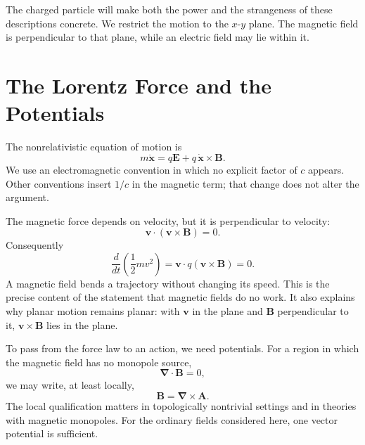 The charged particle will make both the power and the strangeness of these
descriptions concrete. We restrict the motion to the \(x\)-\(y\) plane. The
magnetic field is perpendicular to that plane, while an electric field may
lie within it.

\section{The Lorentz Force and the Potentials}

The nonrelativistic equation of motion is
\begin{equation}
 m\ddot{\bm x}=q\bm E+q\,\dot{\bm x}\times\bm B.
 \label{eq:l08-lorentz-force}
\end{equation}
We use an electromagnetic convention in which no explicit factor of \(c\)
appears. Other conventions insert \(1/c\) in the magnetic term; that change
does not alter the argument.

The magnetic force depends on velocity, but it is perpendicular to velocity:
\begin{equation}
 \bm v\cdot(\bm v\times\bm B)=0.
 \label{eq:l08-magnetic-power}
\end{equation}
Consequently
\begin{equation}
 \frac{d}{dt}\left(\frac12m v^2\right)
 =\bm v\cdot q(\bm v\times\bm B)=0.
 \label{eq:l08-magnetic-no-work}
\end{equation}
A magnetic field bends a trajectory without changing its speed. This is the
precise content of the statement that magnetic fields do no work. It also
explains why planar motion remains planar: with \(\bm v\) in the plane and
\(\bm B\) perpendicular to it, \(\bm v\times\bm B\) lies in the plane.

To pass from the force law to an action, we need potentials. For a region in
which the magnetic field has no monopole source,
\begin{equation}
 \bm\nabla\cdot\bm B=0,
\end{equation}
we may write, at least locally,
\begin{equation}
 \boxed{\bm B=\bm\nabla\times\bm A.}
 \label{eq:l08-vector-potential}
\end{equation}
The local qualification matters in topologically nontrivial settings and in
theories with magnetic monopoles. For the ordinary fields considered here,
one vector potential is sufficient.

\begin{classroomqa}
\end{classroomqa}


